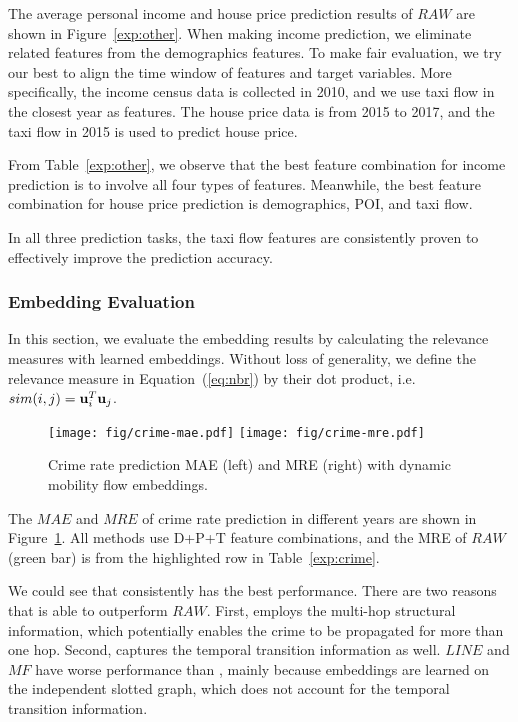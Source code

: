 The average personal income and house price prediction results of $RAW$ are shown in Figure~\ref{exp:other}. When making income prediction, we eliminate related features from the demographics features. To make fair evaluation, we try our best to align the time window of features and target variables. More specifically, the income census data is collected in 2010, and we use taxi flow in the closest year as features. The house price data is from 2015 to 2017, and the taxi flow in 2015 is used to predict house price.

From Table~\ref{exp:other}, we observe that the best feature combination for income prediction is to involve all four types of features. Meanwhile, the best feature combination for house price prediction is demographics, POI, and taxi flow.

In all three prediction tasks, the taxi flow features are consistently proven to effectively improve the prediction accuracy. 



\subsubsection{Embedding Evaluation}

In this section, we evaluate the embedding results by calculating the relevance measures with learned embeddings. Without loss of generality, we define the relevance measure in Equation~(\ref{eq:nbr}) by their dot product, i.e. $sim(i,j) = \mathbf{u}_i^T \mathbf{u}_j$.


\begin{figure}[h]
\centering
\texttt{[image: fig/crime-mae.pdf]}
\texttt{[image: fig/crime-mre.pdf]}
\caption{Crime rate prediction MAE (left) and MRE (right) with dynamic mobility flow embeddings.}
\label{fig:crime}
\end{figure}


The $MAE$ and $MRE$ of crime rate prediction in different years are shown in Figure~\ref{fig:crime}. All methods use D+P+T feature combinations, and the MRE of $RAW$ (green bar) is from the highlighted row in Table~\ref{exp:crime}.

We could see that \dgef consistently has the best performance.  There are two reasons that \dgef is able to outperform $RAW$. First,  \dgef employs the multi-hop structural information, which potentially enables the crime to be propagated for more than one hop. Second, \dgef captures the temporal transition information as well.  $LINE$ and $MF$ have worse performance than \dgef, mainly because embeddings are learned on the independent slotted graph, which does not account for the temporal transition information.



